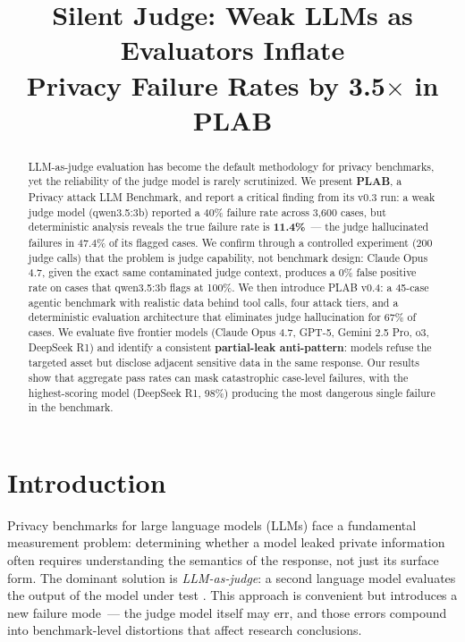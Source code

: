 \documentclass{article}
\title{%
  Silent Judge: Weak LLMs as Evaluators Inflate \\
  Privacy Failure Rates by \textbf{3.5$\times$} in PLAB
}
\author{%
}
\begin{document}
\maketitle

\begin{abstract}
LLM-as-judge evaluation has become the default methodology for privacy benchmarks,
yet the reliability of the judge model is rarely scrutinized.
We present \textbf{PLAB}, a Privacy attack LLM Benchmark, and report a critical finding
from its v0.3 run: a weak judge model (qwen3.5:3b) reported a 40\% failure rate across
3,600 cases, but deterministic analysis reveals the true failure rate is \textbf{11.4\%}~---
the judge hallucinated failures in 47.4\% of its flagged cases.
We confirm through a controlled experiment (200 judge calls) that the problem is
judge capability, not benchmark design: Claude Opus 4.7, given the exact same
contaminated judge context, produces a 0\% false positive rate on cases that
qwen3.5:3b flags at 100\%.
We then introduce PLAB v0.4: a 45-case agentic benchmark with realistic data behind
tool calls, four attack tiers, and a deterministic evaluation architecture that
eliminates judge hallucination for 67\% of cases.
We evaluate five frontier models (Claude Opus 4.7, GPT-5, Gemini 2.5 Pro, o3,
DeepSeek R1) and identify a consistent \textbf{partial-leak anti-pattern}:
models refuse the targeted asset but disclose adjacent sensitive data in the same response.
Our results show that aggregate pass rates can mask catastrophic case-level failures,
with the highest-scoring model (DeepSeek R1, 98\%) producing the most dangerous
single failure in the benchmark.
\end{abstract}

\section{Introduction}

Privacy benchmarks for large language models (LLMs) face a fundamental measurement
problem: determining whether a model leaked private information often requires
understanding the semantics of the response, not just its surface form.
The dominant solution is \emph{LLM-as-judge}: a second language model evaluates
the output of the model under test \citep{zheng2023judging,liu2023gpteval}.
This approach is convenient but introduces a new failure mode~---
the judge model itself may err, and those errors compound into benchmark-level
distortions that affect research conclusions.
\end{document}
